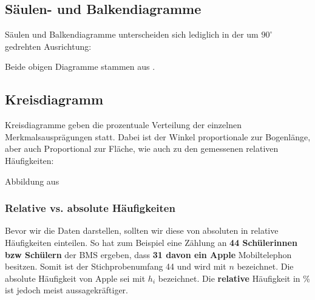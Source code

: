 \subsection{Säulen- und
  Balkendiagramme}
Säulen und Balkendiagramme unterscheiden sich lediglich in der um $90^\circ$ gedrehten Ausrichtung:
\begin{center}
\end{center}
Beide obigen Diagramme stammen aus \cite{marthaler21alg}.

\newpage

\subsection{Kreisdiagramm}
Kreisdiagramme geben die prozentuale Verteilung der einzelnen Merkmalsausprägungen statt. Dabei ist der Winkel proportionale zur Bogenlänge, aber auch Proportional zur Fläche, wie auch zu den gemessenen relativen Häufigkeiten:


Abbildung aus \cite{marthaler21alg}
\newpage

\subsubsection{Relative vs. absolute Häufigkeiten}

Bevor wir die Daten darstellen, sollten wir diese von absoluten in
relative Häufigkeiten einteilen. So hat zum Beispiel eine Zählung an
\textbf{44 Schülerinnen bzw Schülern} der BMS ergeben, dass \textbf{31
  davon ein Apple} Mobiltelephon besitzen. Somit ist der Stichprobenumfang 44 und wird mit $n$
bezeichnet. Die absolute Häufigkeit von Apple sei mit $h_i$
bezeichnet. Die \textbf{relative} Häufigkeit in \% ist
jedoch meist aussagekräftiger.

